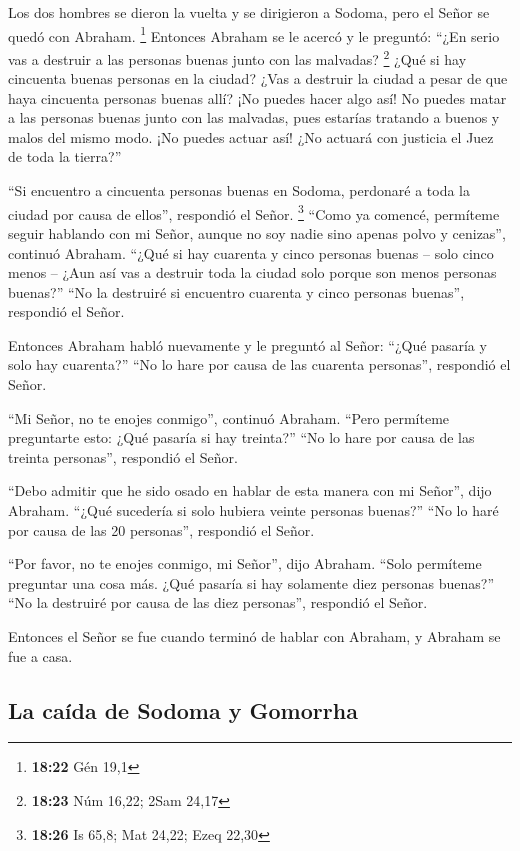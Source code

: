  Los dos hombres se dieron la vuelta y se dirigieron a
Sodoma, pero el Señor se quedó con Abraham. \footnote{\textbf{18:22} Gén
  19,1}  Entonces Abraham se le acercó y le preguntó:
``¿En serio vas a destruir a las personas buenas junto con las malvadas?
\footnote{\textbf{18:23} Núm 16,22; 2Sam 24,17}  ¿Qué si
hay cincuenta buenas personas en la ciudad? ¿Vas a destruir la ciudad a
pesar de que haya cincuenta personas buenas allí?  ¡No
puedes hacer algo así! No puedes matar a las personas buenas junto con
las malvadas, pues estarías tratando a buenos y malos del mismo modo.
¡No puedes actuar así! ¿No actuará con justicia el Juez de toda la
tierra?''

 ``Si encuentro a cincuenta personas buenas en Sodoma,
perdonaré a toda la ciudad por causa de ellos'', respondió el Señor.
\footnote{\textbf{18:26} Is 65,8; Mat 24,22; Ezeq 22,30} 
``Como ya comencé, permíteme seguir hablando con mi Señor, aunque no soy
nadie sino apenas polvo y cenizas'', continuó Abraham. 
``¿Qué si hay cuarenta y cinco personas buenas -- solo cinco menos --
¿Aun así vas a destruir toda la ciudad solo porque son menos personas
buenas?'' ``No la destruiré si encuentro cuarenta y cinco personas
buenas'', respondió el Señor.

 Entonces Abraham habló nuevamente y le preguntó al
Señor: ``¿Qué pasaría y solo hay cuarenta?'' ``No lo hare por causa de
las cuarenta personas'', respondió el Señor.

 ``Mi Señor, no te enojes conmigo'', continuó Abraham.
``Pero permíteme preguntarte esto: ¿Qué pasaría si hay treinta?'' ``No
lo hare por causa de las treinta personas'', respondió el Señor.

 ``Debo admitir que he sido osado en hablar de esta
manera con mi Señor'', dijo Abraham. ``¿Qué sucedería si solo hubiera
veinte personas buenas?'' ``No lo haré por causa de las 20 personas'',
respondió el Señor.

 ``Por favor, no te enojes conmigo, mi Señor'', dijo
Abraham. ``Solo permíteme preguntar una cosa más. ¿Qué pasaría si hay
solamente diez personas buenas?'' ``No la destruiré por causa de las
diez personas'', respondió el Señor.

 Entonces el Señor se fue cuando terminó de hablar con
Abraham, y Abraham se fue a casa.

\hypertarget{la-cauxedda-de-sodoma-y-gomorrha}{%
\subsection{La caída de Sodoma y
Gomorrha}\label{la-cauxedda-de-sodoma-y-gomorrha}}

